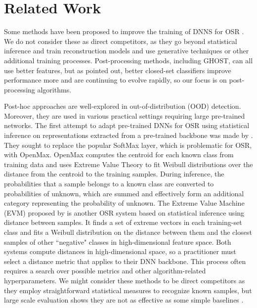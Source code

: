 \section{Related Work}
\label{sec:related}

Some methods have been proposed to improve the training of DNNS for OSR \cite{zhang2022learning,xu2023contrastive,wan2024unlocking,wang2024exploring,li2024all, li2024prototype, sensoy2018evidential}.
We do not consider these as direct competitors, as they go beyond statistical inference and train reconstruction models and use generative techniques or other additional training processes.  
Post-processing methods, including GHOST, can all use better features, but as \citet{vaze2022openset} pointed out, better closed-set classifiers improve performance more and are continuing to evolve rapidly, so our focus is on post-processing algorithms.   

Post-hoc approaches are well-explored in out-of-distribution (OOD) detection. 
Moreover, they are used in various practical settings requiring large pre-trained networks. 
The first attempt to adapt pre-trained DNNs for OSR using statistical inference on representations extracted from a pre-trained backbone was made by \citet{bendale2016openmax}.
They sought to replace the popular SoftMax layer, which is problematic for OSR, with OpenMax.
OpenMax computes the centroid for each known class from training data and uses Extreme Value Theory to fit Weibull distributions over the distance from the centroid to the training samples.
During inference, the probabilities that a sample belongs to a known class are converted to probabilities of unknown, which are summed and effectively form an additional category representing the probability of unknown.
The Extreme Value Machine (EVM) proposed by \citet{rudd2017evm} is another OSR system based on statistical inference using distance between samples. 
It finds a set of extreme vectors in each training-set class and fits a Weibull distribution on the distance between them and the closest samples of other ``negative" classes in high-dimensional feature space.
Both systems compute distances in high-dimensional space, so a practitioner must select a distance metric that applies to their DNN backbone. 
This process often requires a search over possible metrics and other algorithm-related hyperparameters.
We might consider these methods to be direct competitors as they employ straightforward statistical measures to recognize known samples, but large scale evaluation shows they are not as effective as some simple baselines \cite{bisgin2024large}. 


